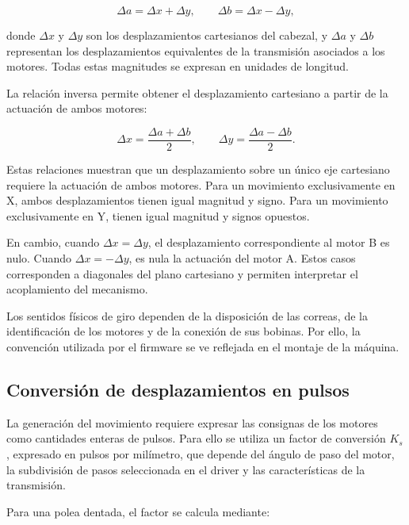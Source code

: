 \documentclass[blue,fullpaper]{ludusofficial}  %
\begin{document}
\begin{equation}
    \Delta a = \Delta x + \Delta y,
    \qquad
    \Delta b = \Delta x - \Delta y,
    \label{eq:corexy-inversa}
\end{equation}

donde $\Delta x$ y $\Delta y$ son los desplazamientos
cartesianos del cabezal, y $\Delta a$ y $\Delta b$
representan los desplazamientos equivalentes
de la transmisión asociados a los motores.
Todas estas magnitudes se expresan en unidades
de longitud.

La relación inversa permite obtener el desplazamiento
cartesiano a partir de la actuación de ambos motores:

\begin{equation}
    \Delta x = \frac{\Delta a + \Delta b}{2},
    \qquad
    \Delta y = \frac{\Delta a - \Delta b}{2}.
    \label{eq:corexy-directa}
\end{equation}

Estas relaciones muestran que un desplazamiento
sobre un único eje cartesiano requiere la actuación
de ambos motores. Para un movimiento exclusivamente
en X, ambos desplazamientos tienen igual magnitud
y signo. Para un movimiento exclusivamente en Y,
tienen igual magnitud y signos opuestos.

En cambio, cuando $\Delta x = \Delta y$, el
desplazamiento correspondiente al motor B es nulo.
Cuando $\Delta x = -\Delta y$, es nula la actuación
del motor A. Estos casos corresponden a diagonales
del plano cartesiano y permiten interpretar
el acoplamiento del mecanismo.

Los sentidos físicos de giro dependen de la disposición
de las correas, de la identificación de los motores
y de la conexión de sus bobinas. Por ello, la convención
utilizada por el firmware se ve reflejada en
el montaje de la máquina.

\subsection{Conversión de desplazamientos en pulsos}

La generación del movimiento requiere expresar
las consignas de los motores como cantidades
enteras de pulsos. Para ello se utiliza un factor
de conversión $K_s$, expresado en pulsos por milímetro,
que depende del ángulo de paso del motor,
la subdivisión de pasos seleccionada en el driver
y las características de la transmisión.

Para una polea dentada, el factor se calcula mediante:
\end{document}
